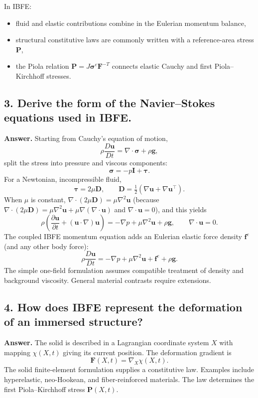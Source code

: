 \documentclass[12pt]{article}
\begin{document}
In IBFE:
\begin{itemize}
    \item fluid and elastic contributions combine in the Eulerian momentum balance,
    \item structural constitutive laws are commonly written with a reference-area stress $\mathbf P$,
    \item the Piola relation $\mathbf P=J\boldsymbol\sigma^{e}\mathbf F^{-T}$ connects elastic Cauchy and first Piola--Kirchhoff stresses.
\end{itemize}

\subsection*{3. Derive the form of the Navier--Stokes equations used in IBFE.}

\textbf{Answer.}
Starting from Cauchy’s equation of motion,
\[
\rho\frac{D\mathbf{u}}{Dt} = \nabla\cdot\boldsymbol{\sigma} + \rho\mathbf{g},
\]
split the stress into pressure and viscous components:
\[
\boldsymbol{\sigma} = -p\mathbf{I} + \boldsymbol{\tau}.
\]
For a Newtonian, incompressible fluid,
\[
\boldsymbol{\tau} = 2\mu \mathbf{D},
\qquad
\mathbf{D} = \tfrac{1}{2}(\nabla \mathbf{u} + \nabla \mathbf{u}^\top).
\]
When $\mu$ is constant, $\nabla\cdot(2\mu\mathbf{D})=\mu\nabla^2\mathbf{u}$ (because $\nabla\cdot(2\mu\mathbf{D}) = \mu\nabla^2\mathbf{u} + \mu\nabla(\nabla\cdot\mathbf{u})$ and $\nabla\cdot\mathbf{u}=0$), and this yields
\[
\rho\left( \frac{\partial \mathbf{u}}{\partial t}
+ (\mathbf{u}\cdot\nabla)\mathbf{u} \right)
= -\nabla p + \mu \nabla^2 \mathbf{u} + \rho \mathbf{g},
\qquad 
\nabla\cdot \mathbf{u} = 0.
\]
The coupled IBFE momentum equation adds an Eulerian elastic force density $\mathbf f^e$ (and any other body force):
\[
\rho\frac{D\mathbf u}{Dt}=-\nabla p+\mu\nabla^2\mathbf u+\mathbf f^e+\rho\mathbf g.
\]
The simple one-field formulation assumes compatible treatment of density and background viscosity. General material contrasts require extensions.

\subsection*{4. How does IBFE represent the deformation of an immersed structure?}

\textbf{Answer.}
The solid is described in a Lagrangian coordinate system $X$ with mapping
$\chi(X,t)$ giving its current position.  
The deformation gradient is
\[
\mathbf{F}(X,t) = \nabla_X \chi(X,t).
\]
The solid finite-element formulation supplies a constitutive law. Examples include hyperelastic, neo-Hookean, and fiber-reinforced materials. The law determines the first Piola--Kirchhoff stress $\mathbf{P}(X,t)$.
\end{document}
